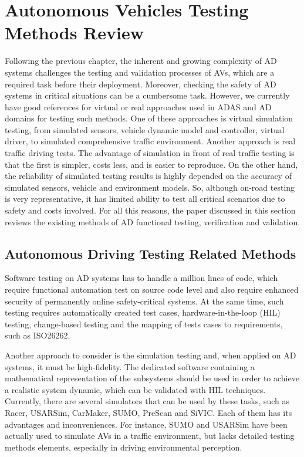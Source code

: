 \documentclass[a4paper, 10pt]{article}
\begin{document}
\section{Autonomous Vehicles Testing Methods Review~\cite{methods}}
Following the previous chapter, the inherent and growing complexity of AD systems challenges the testing and validation processes of AVs, which are a required task before their deployment. Moreover, checking the safety of AD systems in critical situations can be a cumbersome task. However, we currently have good references for virtual or real approaches used in ADAS and AD domains for testing such methods. One of these approaches is virtual simulation testing, from simulated sensors, vehicle dynamic model and controller, virtual driver, to simulated comprehensive traffic environment. Another approach is real traffic driving tests. The advantage of simulation in front of real traffic testing is that the first is simpler, costs less, and is easier to reproduce. On the other hand, the reliability of simulated testing results is highly depended on the accuracy of simulated sensors, vehicle and environment models. So, although on-road testing is very representative, it has limited ability to test all critical scenarios due to safety and costs involved. For all this reasons, the paper discussed in this section reviews the existing methods of AD functional testing, verification and validation.

\subsection{Autonomous Driving Testing Related Methods}
Software testing on AD systems has to handle a million lines of code, which require functional automation test on source code level and also require enhanced security of permanently online safety-critical systems. At the same time, such testing requires automatically created test cases, hardware-in-the-loop (HIL) testing, change-based testing and the mapping of tests cases to requirements, such as ISO26262.

Another approach to consider is the simulation testing and, when applied on AD systems, it must be high-fidelity. The dedicated software containing a mathematical representation of the subsystems should be used in order to achieve a realistic system dynamic, which can be validated with HIL techniques. Currently, there are several simulators that can be used by these tasks, such as Racer, USARSim, CarMaker, SUMO, PreScan and SiVIC. Each of them has its advantages and inconveniences. For instance, SUMO and USARSim have been actually used to simulate AVs in a traffic environment, but lacks detailed testing methods elements, especially in driving environmental perception.
\end{document}
